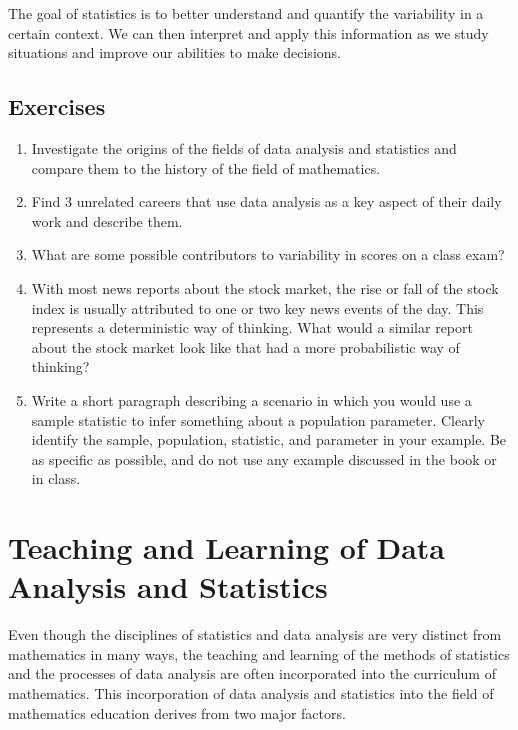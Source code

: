 \documentclass[
]{book}
\theoremstyle{definition}
\theoremstyle{definition}
\theoremstyle{definition}
\theoremstyle{definition}
\theoremstyle{remark}
\begin{document}
The goal of statistics is to better understand and quantify the variability in a certain context. We can then interpret and apply this information as we study situations and improve our abilities to make decisions.

\hypertarget{exercises-58}{%
\subsection{Exercises}\label{exercises-58}}

\begin{enumerate}
\def\labelenumi{\arabic{enumi}.}
\item
  Investigate the origins of the fields of data analysis and statistics and compare them to the history of the field of mathematics.
\item
  Find 3 unrelated careers that use data analysis as a key aspect of their daily work and describe them.
\item
  What are some possible contributors to variability in scores on a class exam?
\item
  With most news reports about the stock market, the rise or fall of the stock index is usually attributed to one or two key news events of the day. This represents a deterministic way of thinking. What would a similar report about the stock market look like that had a more probabilistic way of thinking?
\item
  Write a short paragraph describing a scenario in which you would use a sample statistic to infer something about a population parameter. Clearly identify the sample, population, statistic, and parameter in your example. Be as specific as possible, and do not use any example discussed in the book or in class.
\end{enumerate}

\hypertarget{teaching-and-learning-of-data-analysis-and-statistics}{%
\section{Teaching and Learning of Data Analysis and Statistics}\label{teaching-and-learning-of-data-analysis-and-statistics}}

Even though the disciplines of statistics and data analysis are very distinct from mathematics in many ways, the teaching and learning of the methods of statistics and the processes of data analysis are often incorporated into the curriculum of mathematics. This incorporation of data analysis and statistics into the field of mathematics education derives from two major factors.
\end{document}
